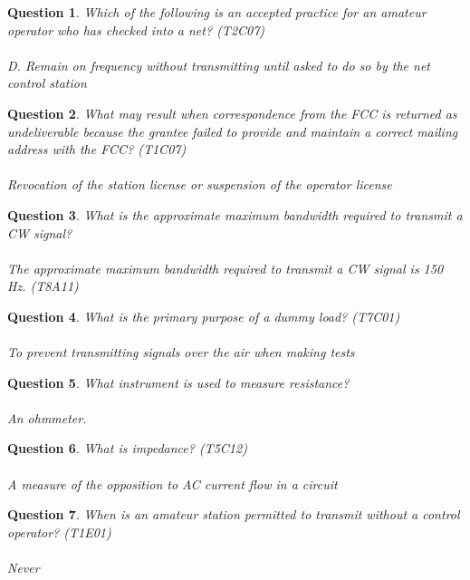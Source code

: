 \documentclass[12pt]{extarticle}
\theoremstyle{plain}
\theoremstyle{plain}
\theoremstyle{plain}
\theoremstyle{Definition}
\theoremstyle{Definition}
\theoremstyle{Definition}
\newtheorem{quest}{Question}[section]
\theoremstyle{plain}
\theoremstyle{plain}
\begin{document}
	\begin{quest}
		Which of the following is an accepted practice for an amateur operator who has checked into a net? (T2C07) \\ \\
		D. 	Remain on frequency without transmitting until asked to do so by the net control station
	\end{quest}

	\begin{quest}
		What may result when correspondence from the FCC is returned as undeliverable because the grantee failed to provide and maintain a correct mailing address with the FCC? (T1C07) \\ \\
		Revocation of the station license or suspension of the operator license
	\end{quest}

	\begin{quest}
		What is the approximate maximum bandwidth required to transmit a CW signal? \\ \\
		The approximate maximum bandwidth required to transmit a CW signal is 150 Hz. (T8A11)
	\end{quest}

	\begin{quest}
		What is the primary purpose of a dummy load? (T7C01)\\ \\
		To prevent transmitting signals over the air when making tests
	\end{quest}

	\begin{quest}
		What instrument is used to measure resistance? \\ \\ 
		An ohmmeter. 
	\end{quest}

	\begin{quest}
		What is impedance? (T5C12) \\ \\ 
		A measure of the opposition to AC current flow in a circuit
	\end{quest}

	\begin{quest}
		When is an amateur station permitted to transmit without a control operator? (T1E01) \\ \\
		Never
	\end{quest}
\end{document}
